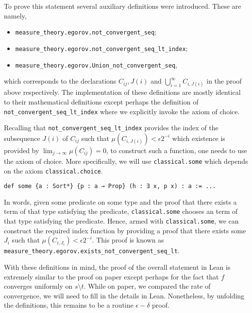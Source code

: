 \documentclass[]{article}
\theoremstyle{definition}
\begin{document}
To prove this statement several auxiliary definitions were introduced. These are 
namely,
\begin{itemize}
  \item \texttt{measure_theory.egorov.not_convergent_seq};
  \item \texttt{measure_theory.egorov.not_convergent_seq_lt_index};
  \item \texttt{measure_theory.egorov.Union_not_convergent_seq},
\end{itemize}
which corresponds to the declarations \(C_{ij}, J(i)\) and \(\bigcup_{i = 1}^\infty C_{i, J(i)}\) 
in the proof above respectively. The implementation of these definitions are mostly
identical to their mathematical definitions except perhaps the definition of 
\texttt{not_convergent_seq_lt_index} where we explicitly invoke 
the axiom of choice. 

Recalling that \texttt{not_convergent_seq_lt_index} provides the index 
of the subsequence \(J(i)\) of \(C_{ij}\) such that \(\mu(C_{i,J(i)}) < \epsilon 2^{-i}\)
which existence is provided by \(\lim_{j \to \infty}\mu(C_{ij}) = 0\), to construct 
such a function, one needs to use the axiom of choice. More specifically, 
we will use \texttt{classical.some} which depends on the axiom 
\texttt{classical.choice}.
\begin{verbatim}
def some {a : Sort*} {p : a → Prop} (h : ∃ x, p x) : a := ...
\end{verbatim}
In words, given some predicate on some type and the proof that there exists a term 
of that type satisfying the predicate, \texttt{classical.some} chooses an 
term of that type satisfying the predicate. Hence, armed with \texttt{classical.some},
we can construct the required index function by providing a proof 
that there exists some \(J_i\) such that \(\mu(C_{i, J_i}) < \epsilon 2^{-i}\).
This proof is known as \texttt{measure_theory.egorov.exists_not_convergent_seq_lt}.

With these definitions in mind, the proof of the overall statement in Lean is 
extremely similar to the proof on paper except perhaps for the fact that \(f\)
converges uniformly on \(s \setminus t\). While on paper, we compared the rate 
of convergence, we will need to fill in the details in Lean. Nonetheless, by 
unfolding the definitions, this remains to be a routine \(\epsilon-\delta\) proof.
\end{document}
